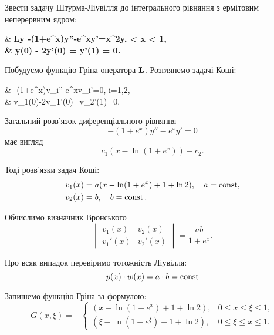 \newpage

\begin{example}
	Звести задачу Штурма-Ліувілля до інтегрального рівняння з ермітовим неперервним ядром:
	\begin{system*}
		& \bf{L}y \equiv -(1+e^x)y''-e^xy'=\lambda x^2y,  < x < 1, \\
		& y(0) - 2y'(0) = y'(1) = 0.
	\end{system*}
\end{example}

\begin{solution}
	Побудуємо функцію Гріна оператора $\bf{L}$. Розглянемо задачі Коші:
	\begin{system*}
		& -(1+e^x)v_i''-e^xv_i'=0, \quad i=1,2,\\
		& v_1(0)-2v_1'(0)=v_2'(1)=0.
	\end{system*}

	Загальний розв'язок диференціального рівняння
	\begin{equation*}
		-(1+e^x)y''-e^xy'=0
	\end{equation*}
	має вигляд
	\begin{equation*}
		c_1(x-\ln(1+e^x))+c_2.
	\end{equation*}

	Тоді розв'язки задач Коші:
	\begin{align*}
		v_1(x) &= a(x - \ln(1+e^x)+1+\ln2), \quad a = \const,\\
		v_2(x) &= b, \quad b = \const.
	\end{align*}

	Обчислимо визначник Вронського
	\begin{equation*}
		\begin{vmatrix} v_1(x) & v_2(x) \\ v_1'(x) & v_2'(x) \end{vmatrix} = \frac{ab}{1+e^x}.
	\end{equation*}

	Про всяк випадок перевіримо тотожність Ліувілля:
	\begin{equation*}
		p(x)\cdot w(x) = a\cdot b = \const
	\end{equation*}

	Запишемо функцію Гріна за формулою:
	\begin{equation*}
		G(x, \xi) = - \begin{cases} (x-\ln(1+e^x)+1+\ln2), & 0\le x \le \xi \le 1, \\ (\xi-\ln(1+e^\xi)+1+\ln2), & 0\le \xi \le x \le 1. \end{cases}
	\end{equation*}


\end{solution}

